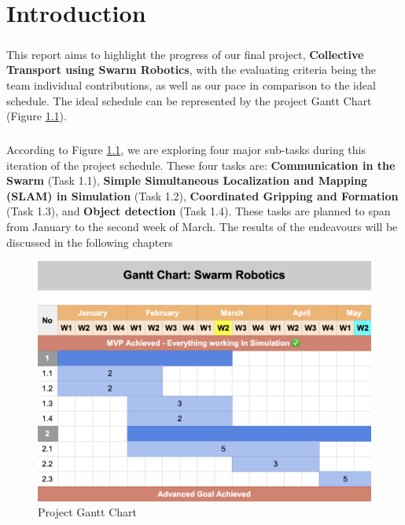 \chapter{Introduction}

\paragraph*{}
This report aims to highlight the progress of our final project, \textbf{Collective Transport using Swarm Robotics}, with the evaluating criteria being the team individual contributions, as well as our pace in comparison to the ideal schedule. The ideal schedule can be represented by the project Gantt Chart (Figure \ref{fig:gantt_chart}).

\paragraph*{}
According to Figure \ref{fig:gantt_chart}, we are exploring four major sub-tasks during this iteration of the project schedule. These four tasks are: \textbf{Communication in the Swarm} (Task 1.1), \textbf{Simple Simultaneous Localization and Mapping (SLAM) in Simulation} (Task 1.2), \textbf{Coordinated Gripping and Formation} (Task 1.3), and \textbf{Object detection} (Task 1.4). These tasks are planned to span from January to the second week of March. The results of the endeavours will be discussed in the following chapters

\begin{figure}[H]
    \centering
    \includegraphics[width=1\linewidth]{assets/images/timeline/gantt_chart.png}
    \caption{Project Gantt Chart}
    \label{fig:gantt_chart}
\end{figure}

